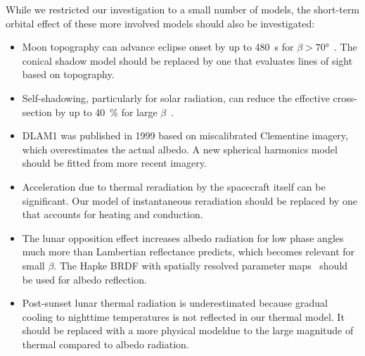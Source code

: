 While we restricted our investigation to a small number of models, the short-term orbital effect of these more involved models should also be investigated:
\begin{itemize}
    \item Moon topography can advance eclipse onset by up to \qty{480}{\s} for $\beta > \ang{70}$~\cite{Mazarico2018}. The conical shadow model should be replaced by one that evaluates lines of sight based on topography.
    \item Self-shadowing, particularly for solar radiation, can reduce the effective cross-section by up to \qty{40}{\percent} for large $\beta$~\cite{Mazarico2018}.
    \item \gls{DLAM1} was published in 1999 based on miscalibrated Clementine imagery, which overestimates the actual albedo. A new spherical harmonics model should be fitted from more recent imagery.
    \item Acceleration due to thermal reradiation by the spacecraft itself can be significant. Our model of instantaneous reradiation should be replaced by one that accounts for heating and conduction.
    \item The lunar opposition effect increases albedo radiation for low phase angles much more than Lambertian reflectance predicts, which becomes relevant for small $\beta$. The Hapke \gls{BRDF} with spatially resolved parameter maps~\cite{Sato2014} should be used for albedo reflection.
    \item Post-sunset lunar thermal radiation is underestimated because gradual cooling to nighttime temperatures is not reflected in our thermal model. It should be replaced with a more physical modeldue to the large magnitude of thermal compared to albedo radiation.
\end{itemize}



\FloatBarrier

